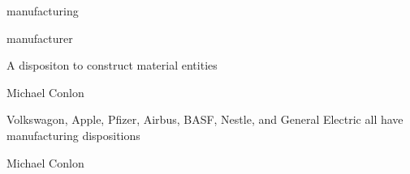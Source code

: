 \documentclass[letterpaper,10pt,english]{sphinxmanual}
\begin{document}
\begin{sphinxShadowBox}

\sphinxAtStartPar
manufacturing
\end{sphinxShadowBox}

\begin{sphinxShadowBox}

\sphinxAtStartPar
manufacturer
\end{sphinxShadowBox}

\begin{sphinxShadowBox}

\sphinxAtStartPar
{\hyperref[\detokenize{doc-BFO_0000016::doc}]{}}
\end{sphinxShadowBox}

\begin{sphinxShadowBox}

\sphinxAtStartPar
A dispositon to construct material entities
\end{sphinxShadowBox}

\begin{sphinxShadowBox}

\sphinxAtStartPar
Michael Conlon 
\end{sphinxShadowBox}

\begin{sphinxShadowBox}

\sphinxAtStartPar
Volkswagon, Apple, Pfizer, Airbus, BASF, Nestle, and General Electric all have manufacturing dispositions
\end{sphinxShadowBox}

\begin{sphinxShadowBox}

\sphinxAtStartPar
{}
\end{sphinxShadowBox}

\begin{sphinxShadowBox}

\sphinxAtStartPar
Michael Conlon 
\end{sphinxShadowBox}
\end{document}
